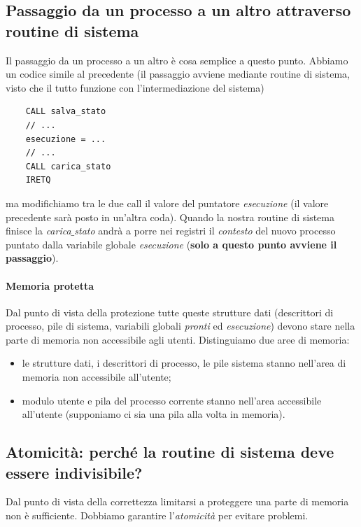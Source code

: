 \subsection{Passaggio da un processo a un altro attraverso routine di sistema} Il passaggio da un processo a un altro è cosa semplice a questo punto. Abbiamo un codice simile al precedente (il passaggio avviene mediante routine di sistema, visto che il tutto funzione con l'intermediazione del sistema)
\begin{verbatim}
	CALL salva_stato
	// ...
	esecuzione = ...
	// ...
	CALL carica_stato
	IRETQ
\end{verbatim}
ma modifichiamo tra le due call il valore del puntatore \emph{esecuzione} (il valore precedente sarà posto in un'altra coda). Quando la nostra routine di sistema finisce la \emph{carica$\_$stato}  andrà a porre nei registri il \emph{contesto} del nuovo processo puntato dalla variabile globale \emph{esecuzione} (\textbf{solo a questo punto avviene il passaggio}).

\paragraph{Memoria protetta} Dal punto di vista della protezione tutte queste strutture dati (descrittori di processo, pile di sistema, variabili globali \emph{pronti} ed \emph{esecuzione}) devono stare nella parte di memoria non accessibile agli utenti. Distinguiamo due aree di memoria:
\begin{itemize}
	\item le strutture dati, i descrittori di processo, le pile sistema stanno nell'area di memoria non accessibile all'utente;
	\item modulo utente e pila del processo corrente stanno nell'area accessibile all'utente (supponiamo ci sia una pila alla volta in memoria).
\end{itemize}

\subsection{Atomicità: perché la routine di sistema deve essere indivisibile?} 
Dal punto di vista della correttezza limitarsi a proteggere una parte di memoria non è sufficiente. Dobbiamo garantire l'\emph{atomicità} per evitare problemi.
